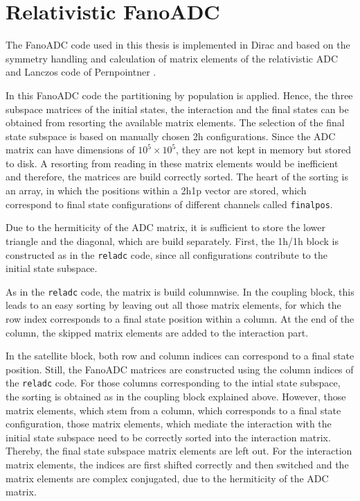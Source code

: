 \section{Relativistic FanoADC}

The FanoADC code used in this thesis is implemented in Dirac \cite{DIRAC13}
and based on the symmetry handling and calculation of matrix elements of
the relativistic \ac{ADC} and Lanczos code of Pernpointner
\cite{Pernpointner04_1,Pernpointner04_2}.

In this FanoADC code the partitioning by population is applied. Hence, the
three subspace matrices of the initial states, the interaction and the final
states can be obtained from resorting the available matrix elements. The
selection of the final state subspace is based on manually chosen 2h
configurations.
Since the \ac{ADC} matrix can have dimensions
of $10^5\times 10^5$, they are not kept
in memory but stored to disk. A resorting from reading in these matrix elements
would be inefficient and therefore, the matrices are build correctly
sorted. The heart of the sorting is an array, in which the positions within
a 2h1p vector are stored, which correspond to final state configurations
of different channels called \verb|finalpos|.

Due to the hermiticity of the \ac{ADC} matrix, it is sufficient to store the
lower triangle and the diagonal, which are build separately. First, the
1h/1h block is constructed as in the \verb|reladc| code, since all
configurations contribute to the initial state subspace.

As in the \verb|reladc| code, the matrix is build columnwise.
In the
coupling block, this leads to an easy sorting by leaving out all those matrix
elements, for which the row index corresponds to a final state position within
a column.
At the end of the column, the skipped matrix elements are added to the
interaction part.

In the satellite block, both row and column indices can correspond to a
final state position. Still, the FanoADC matrices are constructed using
the column indices of the \verb|reladc| code. For those columns corresponding
to the intial state subspace, the sorting is obtained as in the coupling block
explained above. However, those matrix elements,
which stem from a column, which corresponds to a final state configuration,
those matrix elements, which mediate the interaction with the initial state
subspace need to be correctly sorted into the interaction matrix. Thereby,
the final state subspace matrix elements are left out. For the
interaction matrix elements, the indices are first shifted correctly and
then switched and the matrix elements are complex conjugated, due to the
hermiticity of the \ac{ADC} matrix.

